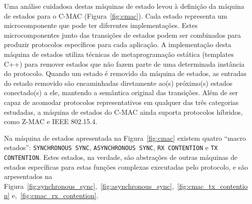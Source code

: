 
Uma análise cuidadosa destas máquinas de estado levou à definição da máquina de
estados para o C-MAC (Figura~\ref{fig:cmac}). Cada estado representa um
microcomponente que pode ter diferentes implementações. Estes microcomponentes
junto das transições de estados podem ser combinados para produzir protocolos
específicos para cada aplicação. A implementação desta máquina de estados
utiliza técnicas de metaprogramação estática (templates C++) para remover
estados que não fazem parte de uma determinada instância do protocolo. Quando um
estado é removido da máquina de estados, as entradas do estado removido são
encaminhadas diretamente ao(s) próximo(s) estados conectado(s) a ele, mantendo a
semântica original das transições. Além de ser capaz de acomodar protocolos
representativos em qualquer das três categorias estudadas, a máquina de estados
do C-MAC ainda suporta protocolos híbridos, como Z-MAC e IEEE 802.15.4.


Na máquina de estados apresentada na Figura~\ref{fig:cmac} existem quatro
``macro estados'': \texttt{SYNCHRONOUS SYNC}, \texttt{ASYNCHRONOUS SYNC},
\texttt{RX CONTENTION} e \texttt{TX CONTENTION}. Estes estados, na verdade, são
abstrações de outras máquinas de estados específicas para estas funções
complexas executadas pelo protocolo, e são arpesentados na
Figura~\ref{fig:synchronous_sync},~\ref{fig:asynchronous_sync},~\ref{fig:cmac_tx_contention}
e,~\ref{fig:cmac_rx_contention}.


